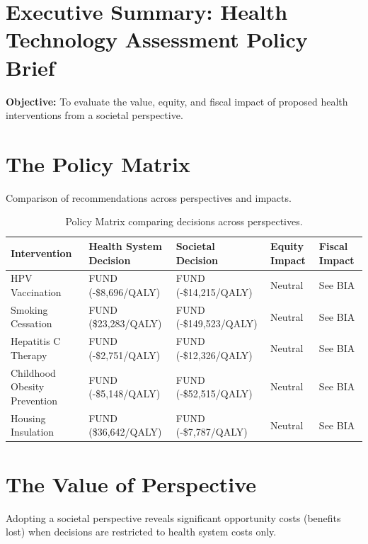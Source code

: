 \documentclass{article}
\author{Dylan A. Mordaunt\\Victoria University of Wellington}
\newcommand{\myabstract}{}
\begin{document}
\maketitle
\begin{abstract}
\myabstract
\end{abstract}

\section*{Executive Summary: Health Technology Assessment Policy Brief}

\textbf{Objective:} To evaluate the value, equity, and fiscal impact of proposed health interventions from a societal perspective.

\section{The Policy Matrix}
Comparison of recommendations across perspectives and impacts.

\begin{table}[H]
\centering
\begin{tabular}{lllll}
\toprule
Intervention & Health System Decision & Societal Decision & Equity Impact & Fiscal Impact \\
\midrule
HPV Vaccination & FUND (-\$8,696/QALY) & FUND (-\$14,215/QALY) & Neutral & See BIA \\
Smoking Cessation & FUND (\$23,283/QALY) & FUND (-\$149,523/QALY) & Neutral & See BIA \\
Hepatitis C Therapy & FUND (-\$2,751/QALY) & FUND (-\$12,326/QALY) & Neutral & See BIA \\
Childhood Obesity Prevention & FUND (-\$5,148/QALY) & FUND (-\$52,515/QALY) & Neutral & See BIA \\
Housing Insulation & FUND (\$36,642/QALY) & FUND (-\$7,787/QALY) & Neutral & See BIA \\
\bottomrule
\end{tabular}
\caption{Policy Matrix comparing decisions across perspectives.}
\end{table}

\section{The Value of Perspective}
Adopting a societal perspective reveals significant opportunity costs (benefits lost) when decisions are restricted to health system costs only.
\end{document}
